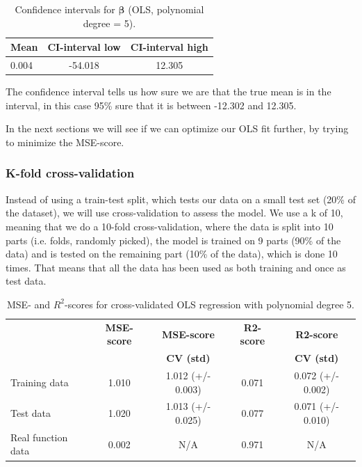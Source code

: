 \documentclass[12pt]{extarticle}
\begin{document}
\begin{table}
  \begin{center}
    \caption{Confidence intervals for $\bm{\beta}$ (OLS, polynomial degree = 5).}
    \label{tab:table2}
    \begin{tabular}{l|c|c} 
      \textbf{Mean} & \textbf{CI-interval low} & \textbf{CI-interval high}\\
      \hline
      0.004 & -54.018 & 12.305\\
    \end{tabular}
  \end{center}
\end{table}


The confidence interval tells us how sure we are that the true mean is in the interval, in this case 95\% sure that it is between -12.302 and 12.305.

In the next sections we will see if we can optimize our OLS fit further, by trying to minimize the MSE-score.


\subsubsection{K-fold cross-validation}

Instead of using a train-test split, which tests our data on a small test set (20\% of the dataset), we will use cross-validation to assess the model. We use a k of 10, meaning that we do a 10-fold cross-validation, where the data is split into 10 parts (i.e. folds, randomly picked), the model is trained on 9 parts (90\% of the data) and is tested on the remaining part (10\% of the data), which is done 10 times. That means that all the data has been used as both training and once as test data.

\begin{table}
  \begin{center}
    \caption{MSE- and $R^2$-scores for cross-validated OLS regression with polynomial degree 5.}
    \label{tab:table3}
    \begin{tabular}{l|c|c|c|c} 
      & \textbf{MSE-score} & \textbf{MSE-score} & \textbf{R2-score} & \textbf{R2-score}\\
      & & \textbf{CV (std)} & & \textbf{CV (std)}\\
      \hline
      Training data & 1.010 & 1.012 (+/- 0.003) & 0.071 & 0.072 (+/- 0.002)\\
      Test data & 1.020 & 1.013 (+/- 0.025) & 0.077 & 0.071 (+/- 0.010)\\
      Real function data & 0.002 & N/A & 0.971 & N/A\\
    \end{tabular}
  \end{center}
\end{table}
\end{document}
